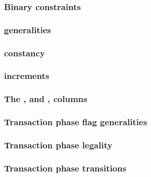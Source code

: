\subsubsection{Binary constraints}                                                           \label{hub: system: fine structure: binarities}                      
\subsubsection{\hubStamp{} generalities}                                                     \label{hub: system: fine structure: hub stamp generalities}          
\subsubsection{\hubStamp{} constancy}                                                        \label{hub: system: fine structure: hub stamp constancy}             
\subsubsection{\hubStamp{} increments}                                                       \label{hub: system: fine structure: hub stamp increments}            
\subsubsection{The \tli, \tliCounter{} and \nonStackRows, \nonStackRowsCounter{} columns}    \label{hub: system: fine structure: counters}                        
\subsubsection{Transaction phase flag generalities}                                          \label{hub: system: fine structure: phase flag generalities}         
\subsubsection{Transaction phase legality}                                                   \label{hub: system: fine structure: transaction phase legality}      
\subsubsection{Transaction phase transitions}                                                \label{hub: system: fine structure: transaction phase transitions}   
